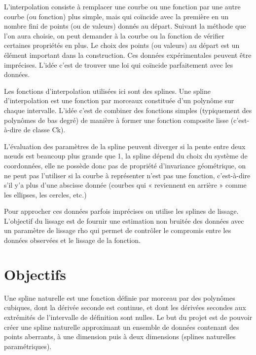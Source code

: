 \documentclass[a4paper,12pt]{article}
\begin{document}
L’interpolation consiste à remplacer une courbe ou une fonction par une autre courbe (ou fonction) plus simple, mais qui coïncide avec la première en un nombre fini de points (ou de valeurs) donnés au départ. Suivant la méthode que l’on aura choisie, on peut demander à la courbe ou la fonction de vérifier certaines propriétés en plus. Le choix des points (ou valeurs) au départ est un élément important dans la construction.
Ces données expérimentales peuvent être imprécises. L’idée c’est de trouver une loi qui coïncide parfaitement avec les données.

Les fonctions d’interpolation utilisées ici sont des splines.
Une spline d’interpolation est une fonction par morceaux constituée d’un polynôme sur chaque intervalle.
L’idée c’est de combiner des fonctions simples (typiquement des polynômes de bas degré) de manière à former une fonction composite lisse (c’est-à-dire de classe Ck).

L’évaluation des paramètres de la spline peuvent diverger si la pente entre deux nœuds est beaucoup plus grande que 1, la spline dépend du choix du système de coordonnées, elle ne possède donc pas de propriété d’invariance géométrique, on ne peut pas l’utiliser si la courbe à représenter n’est pas une fonction, c’est-à-dire s’il y’a plus d’une abscisse donnée (courbes qui « reviennent en arrière » comme les ellipses, les cercles, etc.)

Pour approcher ces données parfois imprécises on utilise les splines de lissage. L’objectif du lissage est de fournir une estimation non bruitée des données avec un paramètre de lissage rho qui permet de contrôler le compromis entre les données observées et le lissage de la fonction.

\newpage
\section{Objectifs}

Une spline naturelle est une fonction définie par morceau par des polynômes cubiques, dont la dérivée seconde est continue, et dont les dérivées secondes aux extrémités de l'intervalle de définition sont nulles.
Le but du projet est de pouvoir créer une spline naturelle approximant un ensemble de données contenant des points aberrants, à une dimension puis à deux dimensions (splines naturelles paramétriques).
\end{document}
